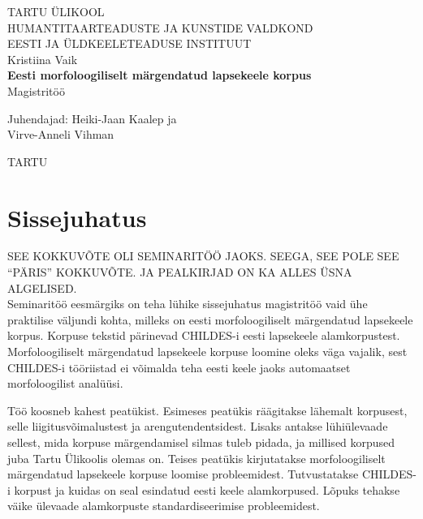 \documentclass[12pt]{article}
\def\autor{Kristiina Vaik}
\def\pealkiri{Eesti morfoloogiliselt märgendatud lapsekeele korpus}
\begin{document}
\begin{titlepage}
    \begin{center}
        {\large TARTU ÜLIKOOL}\\[0.3cm]
        {\large HUMANTITAARTEADUSTE JA KUNSTIDE VALDKOND}\\[0.3cm]
        {\large EESTI JA ÜLDKEELETEADUSE INSTITUUT}\\[0.3cm]

        \vfill
        {\large \autor}\\[0.3cm]
        {\large \textbf{\pealkiri}}\\[0.3cm]
        {\large Magistritöö}

        \vfill
        \begin{center}
        {\large
            Juhendajad: Heiki-Jaan Kaalep ja \\
            Virve-Anneli Vihman
        }
        \end{center}
        \vfill
        {\large TARTU \the\year}
    \end{center}
\end{titlepage}

\tableofcontents

\newpage
\cleardoublepage
{}
{}
\section*{Sissejuhatus}


SEE KOKKUVÕTE OLI SEMINARITÖÖ JAOKS. SEEGA, SEE POLE SEE ``PÄRIS'' KOKKUVÕTE. JA PEALKIRJAD ON KA ALLES ÜSNA ALGELISED.\\

Seminaritöö eesmärgiks on teha lühike sissejuhatus magistritöö vaid ühe praktilise väljundi kohta, milleks on eesti morfoloogiliselt märgendatud lapsekeele korpus. Korpuse tekstid pärinevad CHILDES-i eesti lapsekeele alamkorpustest. Morfoloogiliselt märgendatud lapsekeele korpuse loomine oleks väga vajalik, sest CHILDES-i tööriistad ei võimalda teha eesti keele jaoks automaatset morfoloogilist analüüsi.
 
Töö koosneb kahest peatükist. Esimeses peatükis räägitakse lähemalt korpusest, selle liigitusvõimalustest ja arengutendentsidest. Lisaks antakse lühiülevaade sellest, mida korpuse märgendamisel silmas tuleb pidada, ja millised korpused juba Tartu Ülikoolis olemas on. Teises peatükis kirjutatakse morfoloogiliselt märgendatud lapsekeele korpuse loomise probleemidest. Tutvustatakse CHILDES-i korpust ja kuidas on seal esindatud eesti keele alamkorpused. Lõpuks tehakse väike ülevaade alamkorpuste standardiseerimise probleemidest.
\end{document}
